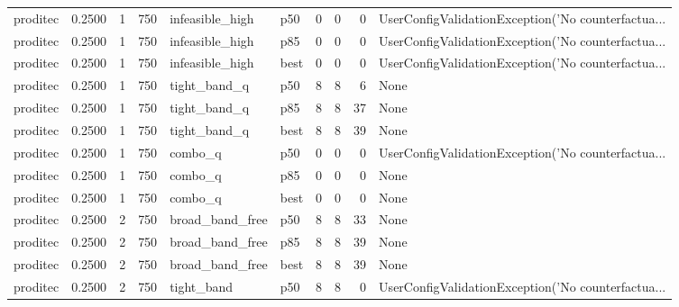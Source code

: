 \begin{tabular}{lrrrllrrrl}
proditec &    0.2500 &    1 &    750 &      infeasible\_high &    p50 &               0 &          0 &       0 & UserConfigValidationException('No counterfactua... \\
proditec &    0.2500 &    1 &    750 &      infeasible\_high &    p85 &               0 &          0 &       0 & UserConfigValidationException('No counterfactua... \\
proditec &    0.2500 &    1 &    750 &      infeasible\_high &   best &               0 &          0 &       0 & UserConfigValidationException('No counterfactua... \\
proditec &    0.2500 &    1 &    750 &         tight\_band\_q &    p50 &               8 &          8 &       6 &                                               None \\
proditec &    0.2500 &    1 &    750 &         tight\_band\_q &    p85 &               8 &          8 &      37 &                                               None \\
proditec &    0.2500 &    1 &    750 &         tight\_band\_q &   best &               8 &          8 &      39 &                                               None \\
proditec &    0.2500 &    1 &    750 &              combo\_q &    p50 &               0 &          0 &       0 & UserConfigValidationException('No counterfactua... \\
proditec &    0.2500 &    1 &    750 &              combo\_q &    p85 &               0 &          0 &       0 &                                               None \\
proditec &    0.2500 &    1 &    750 &              combo\_q &   best &               0 &          0 &       0 &                                               None \\
proditec &    0.2500 &    2 &    750 &      broad\_band\_free &    p50 &               8 &          8 &      33 &                                               None \\
proditec &    0.2500 &    2 &    750 &      broad\_band\_free &    p85 &               8 &          8 &      39 &                                               None \\
proditec &    0.2500 &    2 &    750 &      broad\_band\_free &   best &               8 &          8 &      39 &                                               None \\
proditec &    0.2500 &    2 &    750 &           tight\_band &    p50 &               8 &          8 &       0 & UserConfigValidationException('No counterfactua... \\

\end{tabular}
